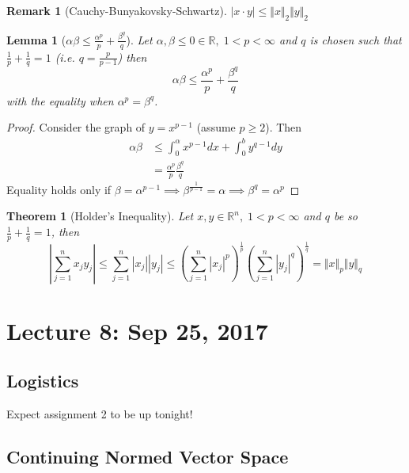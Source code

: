 \documentclass[11pt, oneside]{book}
\theoremstyle{break}
\newtheorem{thm}{Theorem}[section]
\newtheorem*{proof}{Proof}
\newtheorem{lemma}{Lemma}[section]
\newtheorem*{remark}{Remark}
\newcommand{\bb}[1]{\mathbb{#1}}			%
\begin{document}
\begin{remark}[Cauchy-Bunyakovsky-Schwartz]
	$|x \cdot y| \leq \Vert x\Vert _2 \Vert y\Vert _2$
\end{remark}

\begin{lemma}[$\alpha\beta \leq \frac{\alpha^p}{p} + \frac{\beta^q}{q}$]\label{lemma:alphabeta}
	Let $\alpha, \beta \leq 0 \in \bb{R}, \; 1 < p < \infty$ and $q$ is chosen such that $\frac{1}{p} + \frac{1}{q} = 1$ (i.e. $q = \frac{p}{p - 1}$) then
	\begin{equation}
		\alpha\beta \leq \frac{\alpha^p}{p} + \frac{\beta^q}{q}
	\end{equation}
	with the equality when $\alpha^p = \beta^q$.
\end{lemma}

\begin{proof}
	Consider the graph of $y = x^{p - 1}$ (assume $p \geq 2$). Then
	\begin{align*}
		\alpha\beta &\leq \int_{0}^{\alpha} x^{p - 1} dx + \int_{0}^{b} y^{q - 1} dy \\
								&= \frac{\alpha^p}{p} \frac{\beta^q}{q}
	\end{align*}
	Equality holds only if $\beta = \alpha^{p - 1} \implies \beta^{\frac{1}{p-1}} = \alpha \implies \beta^q = \alpha^p$
\end{proof}

\begin{thm}[Holder's Inequality]\label{thm:holder}
	Let $x, y \in \bb{R}^n, \; 1 < p < \infty$ and $q$ be so $\frac{1}{p} + \frac{1}{q} = 1$, then
	\begin{equation}
		\left| \sum_{j=1}^{n} x_j y_j \right| \leq \sum_{j=1}^{n} |x_j| |y_j| \leq \left( \sum_{j=1}^{n} |x_j|^p \right)^\frac{1}{p} \left(\sum_{j=1}^{n} |y_j|^q \right)^\frac{1}{q} = \Vert x\Vert _p \Vert y\Vert _q
	\end{equation}
\end{thm}

\chapter{Lecture 8: Sep 25, 2017}\label{chp:lec8}

\section{Logistics}
Expect assignment 2 to be up tonight!

\section{Continuing Normed Vector Space}\label{sect:normed_cont}
\end{document}
